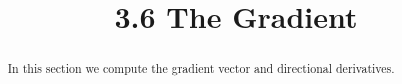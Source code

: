 \documentclass[handout]{ximera}
\title{3.6 The Gradient}
\begin{document}
\begin{abstract}
In this section we compute the gradient vector and directional derivatives.
\end{abstract}

\maketitle
\end{document}
